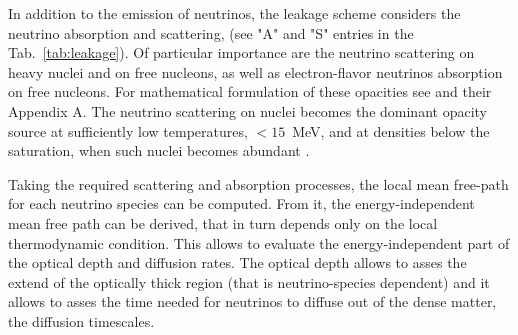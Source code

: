 In addition to the emission of neutrinos, the leakage scheme considers the neutrino absorption and scattering, 
(see "A" and "S" entries in the Tab.~\ref{tab:leakage}).
%
Of particular importance are the neutrino scattering on heavy nuclei and on free nucleons, 
as well as electron-flavor neutrinos absorption on free nucleons. 
For mathematical formulation of these opacities see \citet{Galeazzi:2013mia} and their Appendix A.
%
The neutrino scattering on nuclei becomes the dominant opacity source 
at sufficiently low temperatures, $<15$~MeV, and at densities below 
the saturation, when such nuclei becomes abundant \citep{Rosswog:2003rv}.

Taking the required scattering and absorption processes, the local mean free-path for each neutrino species 
can be computed. From it, the energy-independent mean free path can be derived, that in turn depends 
only on the local thermodynamic condition. 
This allows to evaluate the energy-independent part of the optical depth and diffusion rates.
%
The optical depth allows to asses the extend of the optically thick region 
(that is neutrino-species dependent) and it allows to asses the time needed for neutrinos to 
diffuse out of the dense matter, the diffusion timescales. 
%

%

